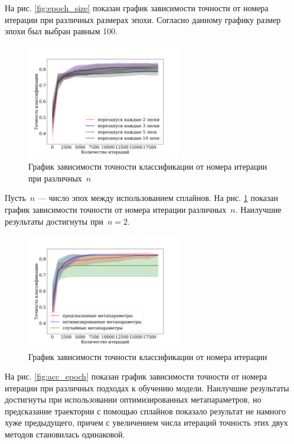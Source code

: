 \documentclass[12pt, twoside]{article}
\begin{document}
На рис. \ref{fig:epoch_size} показан график зависимости точности от номера итерации при различных размерах эпохи. Согласно данному графику размер эпохи был выбран равным 100.

\begin{figure}[!ht]
\centering
\includegraphics[width=0.6\textwidth]{linear_train_splines_every_epoch.pdf}
\caption{График зависимости точности классификации от номера итерации при различных~$n$}
\label{fig:train_splines_every_epoch}
\end{figure}

Пусть~$n$ --- число эпох между использованием сплайнов. На рис. \ref{fig:train_splines_every_epoch} показан график зависимости точности от номера итерации различных~$n$. Наилучшие результаты достигнуты при~$n=2$.

\begin{figure}[!ht]
\centering
\includegraphics[width=0.6\textwidth]{acc_iter.pdf}
\caption{График зависимости точности классификации от номера итерации}
\label{fig:acc_iter}
\end{figure}

На рис. \ref{fig:acc_epoch} показан график зависимости точности от номера итерации при различных подходах к обучению модели. Наилучшие результаты достигнуты при использовании оптимизированных метапараметров, но предсказание траектории с помощью сплайнов показало результат не намного хуже предыдущего, причем с увеличением числа итераций точность этих двух методов становилась одинаковой.
\end{document}
